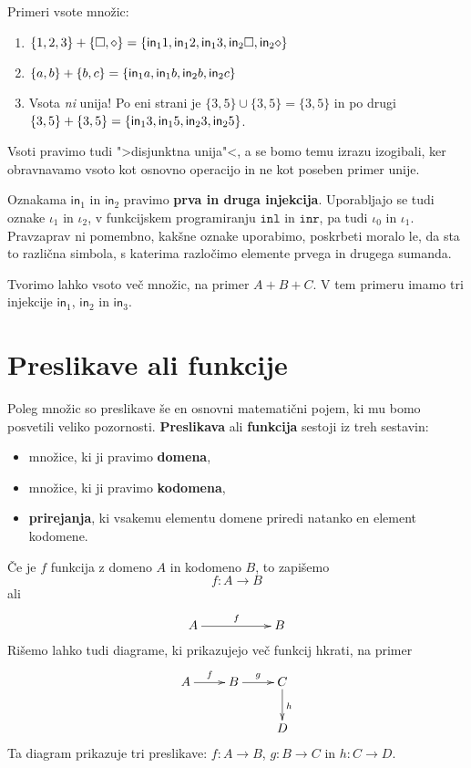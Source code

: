 \begin{primer}
Primeri vsote množic:
%
\begin{enumerate}

\item $\{1, 2, 3\} + \{\square, \diamond\} = \{\mathsf{in}_{1}{1}, \mathsf{in}_{1}{2}, \mathsf{in}_{1}{3}, \mathsf{in}_{2}{\Box}, \mathsf{in}_{2}{\diamond}\}$

\item $\{a, b\} + \{b, c\} = \{\mathsf{in}_{1}{a}, \mathsf{in}_{1}{b}, \mathsf{in}_{2}{b}, \mathsf{in}_{2}{c}\}$

\item Vsota \emph{ni} unija! Po eni strani je
      $\{3, 5\} \cup \{3, 5\} = \{3, 5\}$ in po drugi
      $\{3, 5\} + \{3, 5\} = \{\mathsf{in}_{1}{3}, \mathsf{in}_{1}{5}, \mathsf{in}_{2}{3}, \mathsf{in}_{2}{5}\}$.
\end{enumerate}
\end{primer}

Vsoti pravimo tudi ">disjunktna unija"<, a se bomo temu izrazu izogibali, ker obravnavamo vsoto kot osnovno operacijo in ne kot poseben primer unije.

Oznakama $\mathsf{in}_1$ in $\mathsf{in}_2$ pravimo \textbf{prva in druga injekcija}. Uporabljajo se tudi oznake $\iota_1$ in $\iota_2$, v funkcijskem
programiranju $\mathtt{inl}$ in $\mathtt{inr}$, pa tudi $\iota_0$ in $\iota_1$. Pravzaprav ni pomembno, kakšne oznake uporabimo, poskrbeti moralo
le, da sta to različna simbola, s katerima razločimo elemente prvega in drugega sumanda.

Tvorimo lahko vsoto več množic, na primer $A + B + C$. V tem primeru imamo tri injekcije $\mathsf{in}_1$, $\mathsf{in}_2$ in $\mathsf{in}_3$.

\section{Preslikave ali funkcije}

Poleg množic so preslikave še en osnovni matematični pojem, ki mu bomo posvetili veliko pozornosti. \textbf{Preslikava} ali \textbf{funkcija} sestoji iz treh sestavin:
%
\begin{itemize}
\item množice, ki ji pravimo \textbf{domena},
\item množice, ki ji pravimo \textbf{kodomena},
\item \textbf{prirejanja}, ki vsakemu elementu domene priredi natanko en element kodomene.
\end{itemize}
%
Če je $f$ funkcija z domeno $A$ in kodomeno $B$, to zapišemo
%
\begin{equation*}
  f : A \to B
\end{equation*}
%
ali
%
\begin{equation*}
  \xymatrix{
    {A} \ar[rr]^{f} & & {B}
  }
\end{equation*}
%
Rišemo lahko tudi diagrame, ki prikazujejo več funkcij hkrati, na primer
%
\begin{equation*}
  \xymatrix{
    {A} \ar[r]^{f} &
    {B} \ar[r]^{g} &
    {C} \ar[d]^{h} \\
    & & {D}
  }
\end{equation*}
%
Ta diagram prikazuje tri preslikave: $f : A \to B$, $g : B \to C$ in $h : C \to D$.


